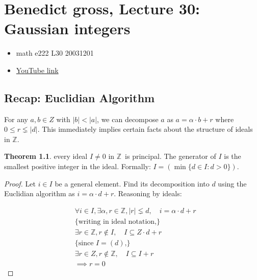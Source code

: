 \documentclass{book}
\newcommand{\Z}{\ensuremath{\mathbb{Z}}}
\theoremstyle{definition}
\newtheorem{theorem}{Theorem}
\begin{document}
\tableofcontents
\chapter{Benedict gross, Lecture 30: Gaussian integers}
\begin{itemize}
    \item math e222 L30 20031201 
    \item \href{https://www.youtube.com/watch?v=itvvxpntpwg&list=PLelIK3uylPMGzHBuR3hLMHrYfMqWWsmx5&index=30}{YouTube link}
\end{itemize}
\section{Recap: Euclidian Algorithm}
For any $a, b \in Z$ with $|b| < |a|$, we can decompose $a$ as
$a = \alpha \cdot b + r$ where $0 \leq r \lneq |d|$. This immediately implies
certain facts about the structure of ideals in \Z. 

\begin{theorem}
every ideal $I \neq 0$ in \Z~is principal. The generator of $I$
is the smallest positive integer in the ideal. Formally: $I = (\min\{ d \in I : d > 0 \})$.
\end{theorem}


\begin{proof}
Let $i \in I$ be a general element. Find its decomposition into $d$ using the
Euclidian algorithm as $i = \alpha \cdot d + r$.
Reasoning by ideals:

\begin{align*}
&\forall i \in I, \exists \alpha, r \in \Z, |r| \lneq d, \quad i = \alpha \cdot d + r \\
&\{ \text{writing in ideal notation,} \} \\
&\exists r \in \Z, r \not \in I,  \quad I \subseteq Z \cdot d + r \\
&\{ \text{since $I = (d)$,} \} \\
&\exists r \in Z, r \not \in \Z, \quad I \subseteq  I + r \\
&\implies r = 0
\end{align*}
\end{proof}
\end{document}
